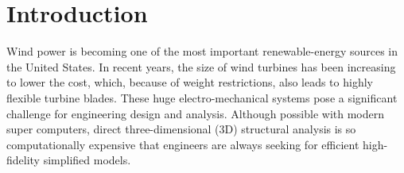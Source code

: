 \section{Introduction} 

Wind power is becoming one of the most important renewable-energy sources in
the United States.
In recent years, the size of wind
turbines has been increasing to lower the cost, which, because of
weight restrictions, also leads
to highly flexible turbine blades. These huge electro-mechanical systems pose
a significant challenge for engineering design and analysis. Although
possible with modern super computers, direct three-dimensional (3D)
structural analysis is so computationally expensive that engineers are
always seeking for efficient high-fidelity simplified models.

